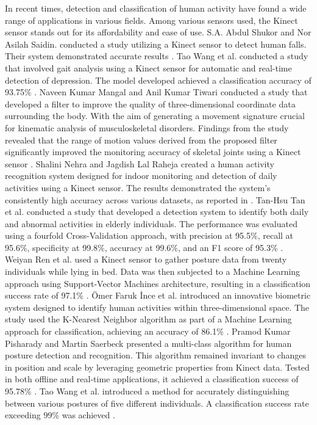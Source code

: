       In recent times, detection and classification of human activity have found a wide range of applications in various fields. Among various sensors used, the Kinect sensor stands out for its affordability and ease of use. S.A. Abdul Shukor and Nor Asilah Saidin. conducted a study utilizing a Kinect sensor to detect human falls. Their system demonstrated accurate results \cite{saidin_analysis_2020}. 
      Tao Wang et al. conducted a study that involved gait analysis using a Kinect sensor for automatic and real-time detection of depression. The model developed achieved a classification accuracy of 93.75\% \cite{wang_gait_2021}.
      Naveen Kumar Mangal and Anil Kumar Tiwari conducted a study that developed a filter to improve the quality of three-dimensional coordinate data surrounding the body. With the aim of generating a movement signature crucial for kinematic analysis of musculoskeletal disorders. Findings from the study revealed that the range of motion values derived from the proposed filter significantly improved the monitoring accuracy of skeletal joints using a Kinect sensor \cite{mangal_kinect_2020}. 
      Shalini Nehra and Jagdish Lal Raheja created a human activity recognition system designed for indoor monitoring and detection of daily activities using a Kinect sensor. The results demonstrated the system's consistently high accuracy across various datasets, as reported in \cite{nehra_unobtrusive_2020}.
      Tan-Hsu Tan et al. conducted a study that developed a detection system to identify both daily and abnormal activities in elderly individuals. The performance was evaluated using a fourfold Cross-Validation approach, with precision at 95.5\%, recall at 95.6\%, specificity at 99.8\%, accuracy at 99.6\%, and an F1 score of 95.3\% \cite{tan_activity_2020}. 
      Weiyan Ren et al. used a Kinect sensor to gather posture data from twenty individuals while lying in bed. Data was then subjected to a Machine Learning approach using Support-Vector Machines architecture, resulting in a classification success rate of 97.1\% \cite{ren_human_2020}.
      \"{O}mer Faruk \.{I}nce et al. introduced an innovative biometric system designed to identify human activities within three-dimensional space. The study used the K-Nearest Neighbor algorithm as part of a Machine Learning approach for classification, achieving an accuracy of 86.1\% \cite{ince_human_2020}.
      Pramod Kumar Pisharady and Martin Saerbeck presented a multi-class algorithm for human posture detection and recognition. This algorithm remained invariant to changes in position and scale by leveraging geometric properties from Kinect data. Tested in both offline and real-time applications, it achieved a classification success of 95.78\% \cite{pisharady_kinect_2013}.
      Tao Wang et al. introduced a method for accurately distinguishing between various postures of five different individuals. A classification success rate exceeding 99\% was achieved \cite{wang_gait_2021}.


